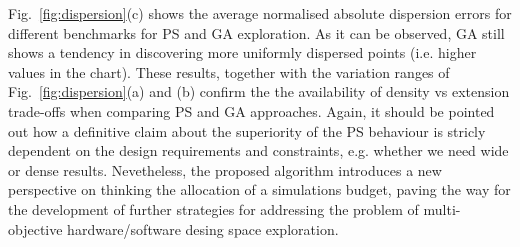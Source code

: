 Fig.~\ref{fig:dispersion}(c) shows the average normalised absolute
dispersion errors for different benchmarks for PS and GA
exploration. As it can be observed, GA still shows a tendency in
discovering more uniformly dispersed points (i.e. higher values in the
chart). These results,
together with the variation ranges of Fig.~\ref{fig:dispersion}(a) and
(b) confirm the the availability of density vs extension trade-offs
when comparing PS and GA approaches. Again, it
should be pointed out how a definitive claim about the superiority of
the PS behaviour is stricly dependent on the design 
requirements and constraints, e.g. whether we need wide or dense
results. Nevetheless, the proposed algorithm introduces a new
perspective on thinking the allocation of a simulations budget, paving the way for
the development of further strategies for addressing the problem of
multi-objective hardware/software desing space exploration.

